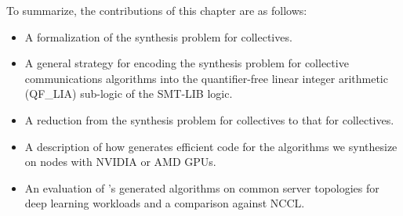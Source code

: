 To summarize, the contributions of this chapter are as follows:
\begin{itemize}
    \item A formalization of the synthesis problem for \broadcasting
    collectives.
    \item A general strategy for encoding the synthesis problem for
    collective communications algorithms into the quantifier-free
    linear integer arithmetic (QF\_LIA) sub-logic of the SMT-LIB
    logic.
    \item A reduction from the synthesis problem for \reducing
    collectives to that for \broadcasting collectives.
    \item A description of how \tool{} generates efficient code for
    the algorithms we synthesize on nodes with NVIDIA or AMD GPUs.
    \item An evaluation of \tool's generated algorithms on common
    server topologies for deep learning workloads and a comparison
    against NCCL.
\end{itemize}


